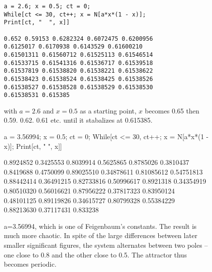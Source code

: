\documentclass{article}
\begin{document}
\begin{figure}[h]
\begin{lstlisting}
a = 2.6; x = 0.5; ct = 0;
While[ct <= 30, ct++; x = N[a*x*(1 - x)];
Print[ct, "  ", x]]

0.652 0.59153 0.6282324 0.6072475 0.6200956
0.6125017 0.6170938 0.6143529 0.61600210 
0.61501311 0.61560712 0.61525113 0.61546514
0.61533715 0.61541316 0.61536717 0.61539518 
0.61537819 0.61538820 0.61538221 0.61538622
0.61538423 0.61538524 0.61538425 0.61538526
0.61538527 0.61538528 0.61538529 0.61538530
0.61538531 0.615385
\end{lstlisting}
\caption{with $a=2.6$ and $x=0.5$ as a starting point, $x$ becomes 0.65 then 0.59. 0.62. 0.61
etc.
until it stabalizes at 0.615385.}
\end{figure}
\begin{figure}[h]
a = 3.56994; x = 0.5; ct = 0;
While[ct <= 30, ct++; x = N[a*x*(1 - x)];
Print[ct, "  ", x]]

0.8924852 0.3425553 0.8039914 0.5625865
0.8785026 0.3810437 0.8419688 0.4750099
0.89025510 0.34878611 0.81085612 0.54751813
0.88442414 0.36491215 0.82733816 0.50996617 
0.8921318 0.34354919 0.80510320 0.56016621
0.87956222 0.37817323 0.83950124 0.48101125 
0.89119826 0.34615727 0.80799328 0.55384229 
0.88213630 0.37117431 0.833238
\caption{a=3.56994, which is one of Feigenbaum's constants.  The result is
much more chaotic. In spite of the large differences between later
smaller significant figures, the system alternates between two poles -- one
close to 0.8 and the other close to 0.5.  The attractor thus becomes
periodic.}
\end{figure}
\end{document}
